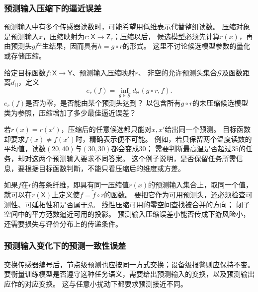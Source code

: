 \subsubsection{预测输入压缩下的逼近误差}
\label{sec:future-analysis-input-compression}

预测输入中有多个传感器读数时，可能希望用低维表示代替整组读数。
压缩对象是预测输入$x$，压缩映射为$r:\mathsf X\to\mathsf Z_r$；压缩以后，
候选模型必须先计算$r(x)$，再由预测头$g$产生结果，因而具有$h=g\circ r$的形式。
这里不讨论候选模型参数的量化或存储压缩。

\begin{mathproblem}[预测输入压缩造成的最佳逼近误差]
  \label{question:future-input-compression}
  给定目标函数$f:\mathsf X\to\mathsf Y$、预测输入压缩映射$r$、
  非空的允许预测头集合$\mathcal G$及函数距离$d_{\mathsf H}$，定义
  \[
    e_r(f)=\inf_{g\in\mathcal G}d_{\mathsf H}(g\circ r,f).
  \]
  $e_r(f)$是否为零，是否能由某个预测头达到？
  以包含所有$g\circ r$的未压缩候选模型类为参照，压缩增加了多少最佳逼近误差？
\end{mathproblem}

若$r(x)=r(x')$，压缩后的任意候选都只能对$x,x'$给出同一个预测。
目标函数却要求$f(x)\ne f(x')$时，精确表示便不可能。
例如，若只保留两个温度读数的平均值，读数$(20,40)$与$(30,30)$都会变成$30$；
需要判断最高温是否超过$35$的任务，却对这两个预测输入要求不同答案。
这个例子说明，是否保留任务所需信息，要根据目标函数判断，不能只看压缩后的维度或方差。

如果$f$在$r$的每条纤维，即具有同一压缩值$r(x)$的预测输入集合上，取同一个值，就可以在$r(\mathsf X)$上定义使$f=\widetilde f\circ r$的函数。
要把它作为可用预测头，还必须检查可测性、可延拓性和是否属于$\mathcal G$。
线性压缩可用的零空间查找被合并的方向；
闭子空间中的平方范数逼近可用的投影。
预测输入压缩误差小能否传成下游风险小，还需要损失与评价分布上的传递条件。

\subsubsection{预测输入变化下的预测一致性误差}
\label{sec:future-analysis-structural-property}

交换传感器编号后，节点级预测也应按同一方式交换；设备级报警则应保持不变。
要衡量训练模型是否遵守这种任务语义，需要给出预测输入的变换，以及预测输出应作的对应变换。
这与任意小扰动下都要求预测接近不同。

